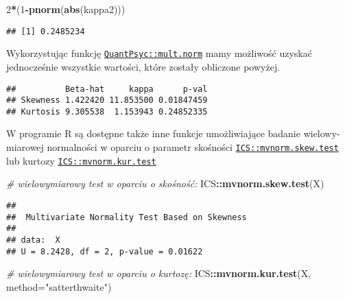 \documentclass[polish,]{book}
\newenvironment{Shaded}{\begin{snugshade}}{\end{snugshade}}
\newcommand{\CommentTok}[1]{\textcolor[rgb]{0.56,0.35,0.01}{\textit{#1}}}
\newcommand{\DataTypeTok}[1]{\textcolor[rgb]{0.13,0.29,0.53}{#1}}
\newcommand{\DecValTok}[1]{\textcolor[rgb]{0.00,0.00,0.81}{#1}}
\newcommand{\KeywordTok}[1]{\textcolor[rgb]{0.13,0.29,0.53}{\textbf{#1}}}
\newcommand{\NormalTok}[1]{#1}
\newcommand{\OperatorTok}[1]{\textcolor[rgb]{0.81,0.36,0.00}{\textbf{#1}}}
\newcommand{\StringTok}[1]{\textcolor[rgb]{0.31,0.60,0.02}{#1}}
\begin{document}
\begin{Shaded}
\begin{Highlighting}[]
\DecValTok{2}\OperatorTok{*}\NormalTok{(}\DecValTok{1}\OperatorTok{-}\KeywordTok{pnorm}\NormalTok{(}\KeywordTok{abs}\NormalTok{(kappa2)))}
\end{Highlighting}
\end{Shaded}

\begin{verbatim}
## [1] 0.2485234
\end{verbatim}

Wykorzystując funkcję \href{https://rdrr.io/cran/QuantPsyc/man/mult.norm.html}{\texttt{QuantPsyc::mult.norm}} mamy możliwość uzyskać jednocześnie wszystkie wartości, które zostały obliczone powyżej.

\begin{Shaded}
\end{Shaded}

\begin{verbatim}
##          Beta-hat     kappa      p-val
## Skewness 1.422420 11.853500 0.01847459
## Kurtosis 9.305538  1.153943 0.24852335
\end{verbatim}

W programie R są dostępne także inne funkcje umożliwiające badanie wielowy-
miarowej normalności w oparciu o parametr skośności \href{https://rdrr.io/cran/ICS/man/mvnorm.skew.test.html}{\texttt{ICS::mvnorm.skew.test}} lub
kurtozy \href{https://rdrr.io/cran/ICS/man/mvnorm.kur.test.html}{\texttt{ICS::mvnorm.kur.test}}

\begin{Shaded}
\begin{Highlighting}[]
\CommentTok{# wielowymiarowy test w oparciu o skośność:}
\NormalTok{ICS}\OperatorTok{::}\KeywordTok{mvnorm.skew.test}\NormalTok{(X)}
\end{Highlighting}
\end{Shaded}

\begin{verbatim}
## 
##  Multivariate Normality Test Based on Skewness
## 
## data:  X
## U = 8.2428, df = 2, p-value = 0.01622
\end{verbatim}

\begin{Shaded}
\begin{Highlighting}[]
\CommentTok{# wielowymiarowy test w oparciu o kurtozę:}
\NormalTok{ICS}\OperatorTok{::}\KeywordTok{mvnorm.kur.test}\NormalTok{(X, }\DataTypeTok{method=}\StringTok{"satterthwaite"}\NormalTok{)}
\end{Highlighting}
\end{Shaded}
\end{document}
